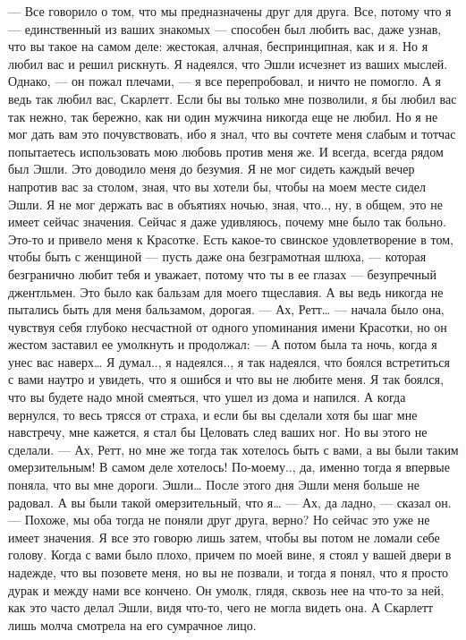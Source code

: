 — Все говорило о том, что мы предназначены друг для друга. Все, потому что я — единственный из ваших знакомых — способен был любить вас, даже узнав, что вы такое на самом деле: жестокая, алчная, беспринципная, как и я. Но я любил вас и решил рискнуть. Я надеялся, что Эшли исчезнет из ваших мыслей. Однако, — он пожал плечами, — я все перепробовал, и ничто не помогло. А я ведь так любил вас, Скарлетт. Если бы вы только мне позволили, я бы любил вас так нежно, так бережно, как ни один мужчина никогда еще не любил. Но я не мог дать вам это почувствовать, ибо я знал, что вы сочтете меня слабым и тотчас попытаетесь использовать мою любовь против меня же. И всегда, всегда рядом был Эшли. Это доводило меня до безумия. Я не мог сидеть каждый вечер напротив вас за столом, зная, что вы хотели бы, чтобы на моем месте сидел Эшли. Я не мог держать вас в объятиях ночью, зная, что.., ну, в общем, это не имеет сейчас значения. Сейчас я даже удивляюсь, почему мне было так больно. Это-то и привело меня к Красотке. Есть какое-то свинское удовлетворение в том, чтобы быть с женщиной — пусть даже она безграмотная шлюха, — которая безгранично любит тебя и уважает, потому что ты в ее глазах — безупречный джентльмен. Это было как бальзам для моего тщеславия. А вы ведь никогда не пытались быть для меня бальзамом, дорогая.
— Ах, Ретт… — начала было она, чувствуя себя глубоко несчастной от одного упоминания имени Красотки, но он жестом заставил ее умолкнуть и продолжал:
— А потом была та ночь, когда я унес вас наверх… Я думал.., я надеялся.., я так надеялся, что боялся встретиться с вами наутро и увидеть, что я ошибся и что вы не любите меня. Я так боялся, что вы будете надо мной смеяться, что ушел из дома и напился. А когда вернулся, то весь трясся от страха, и если бы вы сделали хотя бы шаг мне навстречу, мне кажется, я стал бы Целовать след ваших ног. Но вы этого не сделали.
— Ах, Ретт, но мне же тогда так хотелось быть с вами, а вы были таким омерзительным! В самом деле хотелось! По-моему.., да, именно тогда я впервые поняла, что вы мне дороги. Эшли… После этого дня Эшли меня больше не радовал. А вы были такой омерзительный, что я…
— Ах, да ладно, — сказал он. — Похоже, мы оба тогда не поняли друг друга, верно? Но сейчас это уже не имеет значения. Я все это говорю лишь затем, чтобы вы потом не ломали себе голову. Когда с вами было плохо, причем по моей вине, я стоял у вашей двери в надежде, что вы позовете меня, но вы не позвали, и тогда я понял, что я просто дурак и между нами все кончено.
Он умолк, глядя, сквозь нее на что-то за ней, как это часто делал Эшли, видя что-то, чего не могла видеть она. А Скарлетт лишь молча смотрела на его сумрачное лицо.
